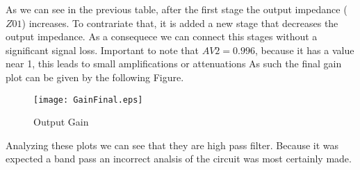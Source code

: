 \newpage

As we can see in the previous table, after the first stage the output impedance ($Z01$) increases. To contrariate that, it is added a new stage that decreases the output impedance. As a consequece we can connect this stages without a significant signal loss. Important to note that $AV2=0.996$, 
because it has a value near 1, this leads to small amplifications or attenuations
As such the final gain plot can be given by the following Figure.
\begin{figure}[h]
\centering
\texttt{[image: GainFinal.eps]}
\caption{Output Gain}
\label{plot:ganho2}
\end{figure}

Analyzing these plots we can see that they are high pass filter. Because it was expected a band pass an incorrect analsis of the circuit was most certainly made.